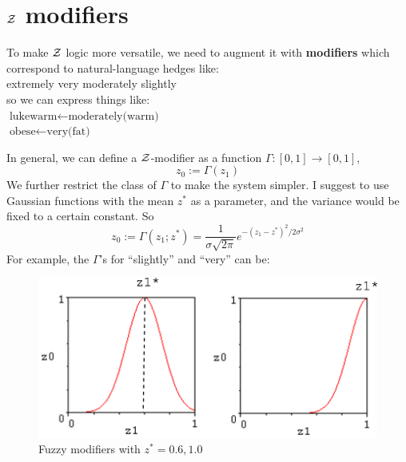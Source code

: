 \section{$\mathcal{Z}$ modifiers}
\label{sec:Z-modifiers}

To make $\mathcal{Z}$ logic more versatile, we need to augment it with \textbf{modifiers} which correspond to natural-language hedges like:\\
\hspace*{1cm} extremely \hspace*{1cm} very \hspace*{1cm} moderately \hspace*{1cm} slightly\\
so we can express things like:\\
\hspace*{1cm} $\mbox{lukewarm} \leftarrow \mbox{moderately(warm)}$\\
\hspace*{1cm} $\mbox{obese} \leftarrow \mbox{very(fat)}$

In general, we can define a $\mathcal{Z}$-modifier as a function $\Gamma: [0,1] \rightarrow [0,1]$,
\begin{equation}
z_0 := \Gamma(z_1)
\end{equation}
We further restrict the class of $\Gamma$ to make the system simpler.  I suggest to use Gaussian functions with the mean $z^*$ as a parameter, and the variance would be fixed to a certain constant.  So
\begin{equation}
z_0 := \Gamma(z_1; z^*) = \frac{1}{\sigma \sqrt{2 \pi}} e^{- (z_1-z^*)^2 / 2 \sigma^2}
\label{eqn:fuzzy-moderator-Gaussian}
\end{equation}
For example, the $\Gamma$'s for ``slightly'' and ``very'' can be:
\begin{figure}[H]
\centering
\includegraphics[scale=0.9]{fuzzy-modifiers.png}
\caption{Fuzzy modifiers with $z^* = 0.6, 1.0$}
\end{figure}

